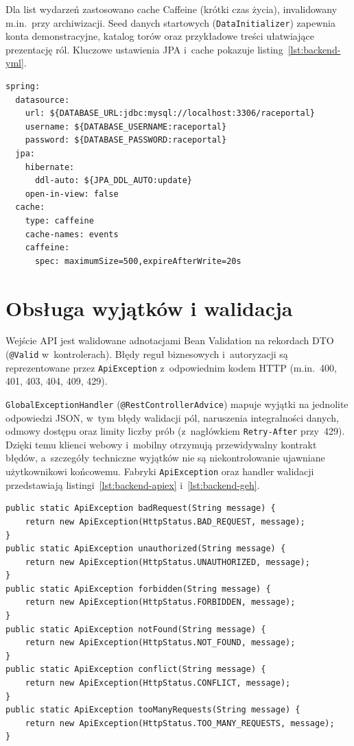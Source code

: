 \documentclass{sprz}
\begin{document}
Dla list wydarzeń zastosowano cache Caffeine (krótki czas życia), invalidowany m.in.\ przy archiwizacji. Seed danych startowych (\texttt{DataInitializer}) zapewnia konta demonstracyjne, katalog torów oraz przykładowe treści ułatwiające prezentację ról. Kluczowe ustawienia JPA i~cache pokazuje listing~\ref{lst:backend-yml}.

\begin{lstlisting}[caption={Konfiguracja MySQL/JPA i cache Caffeine (\texttt{application.yml})},label={lst:backend-yml},language={}]
spring:
  datasource:
    url: ${DATABASE_URL:jdbc:mysql://localhost:3306/raceportal}
    username: ${DATABASE_USERNAME:raceportal}
    password: ${DATABASE_PASSWORD:raceportal}
  jpa:
    hibernate:
      ddl-auto: ${JPA_DDL_AUTO:update}
    open-in-view: false
  cache:
    type: caffeine
    cache-names: events
    caffeine:
      spec: maximumSize=500,expireAfterWrite=20s
\end{lstlisting}

\section{Obsługa wyjątków i walidacja}
Wejście API jest walidowane adnotacjami Bean Validation na rekordach DTO (\texttt{@Valid} w~kontrolerach). Błędy reguł biznesowych i~autoryzacji są reprezentowane przez \texttt{ApiException} z~odpowiednim kodem HTTP (m.in.\ 400, 401, 403, 404, 409, 429).

\texttt{GlobalExceptionHandler} (\texttt{@RestControllerAdvice}) mapuje wyjątki na jednolite odpowiedzi JSON, w~tym błędy walidacji pól, naruszenia integralności danych, odmowy dostępu oraz limity liczby prób (z~nagłówkiem \texttt{Retry-After} przy~429). Dzięki temu klienci webowy i~mobilny otrzymują przewidywalny kontrakt błędów, a~szczegóły techniczne wyjątków nie są niekontrolowanie ujawniane użytkownikowi końcowemu. Fabryki \texttt{ApiException} oraz handler walidacji przedstawiają listingi~\ref{lst:backend-apiex} i~\ref{lst:backend-geh}.

\begin{lstlisting}[caption={Fabryki wyjątków biznesowych API},label={lst:backend-apiex}]
public static ApiException badRequest(String message) {
    return new ApiException(HttpStatus.BAD_REQUEST, message);
}
public static ApiException unauthorized(String message) {
    return new ApiException(HttpStatus.UNAUTHORIZED, message);
}
public static ApiException forbidden(String message) {
    return new ApiException(HttpStatus.FORBIDDEN, message);
}
public static ApiException notFound(String message) {
    return new ApiException(HttpStatus.NOT_FOUND, message);
}
public static ApiException conflict(String message) {
    return new ApiException(HttpStatus.CONFLICT, message);
}
public static ApiException tooManyRequests(String message) {
    return new ApiException(HttpStatus.TOO_MANY_REQUESTS, message);
}
\end{lstlisting}
\end{document}
